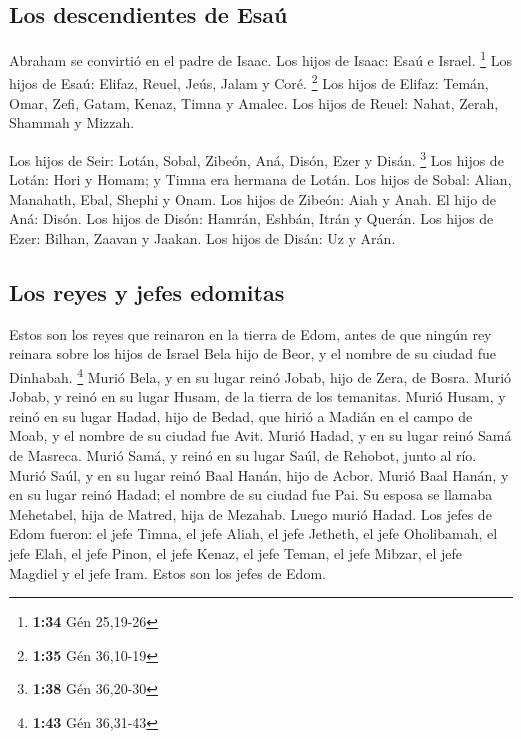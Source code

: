 \hypertarget{los-descendientes-de-esauxfa}{%
\subsection{Los descendientes de
Esaú}\label{los-descendientes-de-esauxfa}}

 Abraham se convirtió en el padre de Isaac. Los hijos de
Isaac: Esaú e Israel. \footnote{\textbf{1:34} Gén 25,19-26}
 Los hijos de Esaú: Elifaz, Reuel, Jeús, Jalam y Coré.
\footnote{\textbf{1:35} Gén 36,10-19}  Los hijos de
Elifaz: Temán, Omar, Zefi, Gatam, Kenaz, Timna y Amalec. 
Los hijos de Reuel: Nahat, Zerah, Shammah y Mizzah.

 Los hijos de Seir: Lotán, Sobal, Zibeón, Aná, Disón,
Ezer y Disán. \footnote{\textbf{1:38} Gén 36,20-30}  Los
hijos de Lotán: Hori y Homam; y Timna era hermana de Lotán.
 Los hijos de Sobal: Alian, Manahath, Ebal, Shephi y
Onam. Los hijos de Zibeón: Aiah y Anah.  El hijo de Aná:
Disón. Los hijos de Disón: Hamrán, Eshbán, Itrán y Querán.
 Los hijos de Ezer: Bilhan, Zaavan y Jaakan. Los hijos de
Disán: Uz y Arán.

\hypertarget{los-reyes-y-jefes-edomitas}{%
\subsection{Los reyes y jefes
edomitas}\label{los-reyes-y-jefes-edomitas}}

 Estos son los reyes que reinaron en la tierra de Edom,
antes de que ningún rey reinara sobre los hijos de Israel Bela hijo de
Beor, y el nombre de su ciudad fue Dinhabah. \footnote{\textbf{1:43} Gén
  36,31-43}  Murió Bela, y en su lugar reinó Jobab, hijo
de Zera, de Bosra.  Murió Jobab, y reinó en su lugar
Husam, de la tierra de los temanitas.  Murió Husam, y
reinó en su lugar Hadad, hijo de Bedad, que hirió a Madián en el campo
de Moab, y el nombre de su ciudad fue Avit.  Murió Hadad,
y en su lugar reinó Samá de Masreca.  Murió Samá, y reinó
en su lugar Saúl, de Rehobot, junto al río.  Murió Saúl,
y en su lugar reinó Baal Hanán, hijo de Acbor.  Murió
Baal Hanán, y en su lugar reinó Hadad; el nombre de su ciudad fue Pai.
Su esposa se llamaba Mehetabel, hija de Matred, hija de Mezahab.
 Luego murió Hadad. Los jefes de Edom fueron: el jefe
Timna, el jefe Aliah, el jefe Jetheth,  el jefe
Oholibamah, el jefe Elah, el jefe Pinon,  el jefe Kenaz,
el jefe Teman, el jefe Mibzar,  el jefe Magdiel y el jefe
Iram. Estos son los jefes de Edom.

